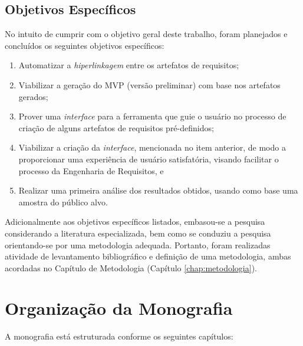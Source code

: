 \subsection{Objetivos Específicos}

\label{sec:objetivos_especificos}

No intuito de cumprir com o objetivo geral deste trabalho, foram planejados e concluídos os seguintes objetivos específicos:

\begin{enumerate}
    \item \label{oe_hiperlinkagem} Automatizar a \textit{hiperlinkagem} entre os artefatos de requisitos;
    \item \label{oe_mvp} Viabilizar a geração do MVP (versão preliminar) com base nos artefatos gerados;
    \item \label{oe_guiar_usuario} Prover uma \textit{interface} para a ferramenta que guie o usuário no processo de criação de alguns artefatos de requisitos pré-definidos;
    \item \label{oe_ux_facilitada} Viabilizar a criação da \textit{interface}, mencionada no item anterior, de modo a proporcionar uma experiência de usuário satisfatória, visando facilitar o processo da Engenharia de Requisitos, e
    \item \label{oe_resultados} Realizar uma primeira análise dos resultados obtidos, usando como base uma amostra do público alvo.
\end{enumerate}

Adicionalmente aos objetivos específicos listados, embasou-se a pesquisa considerando a literatura especializada, bem como se conduziu a pesquisa orientando-se por uma metodologia adequada. Portanto, foram realizadas atividade de levantamento bibliográfico e definição de uma metodologia, ambas acordadas no Capítulo de Metodologia (Capítulo \ref{chap:metodologia}).


\section{Organização da Monografia}

\label{ref:organizacao}

A monografia está estruturada conforme os seguintes capítulos:

